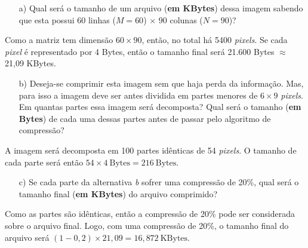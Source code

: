 \documentclass[a4paper,11pt]{article}
\begin{document}
\begin{itemize}
    \item [a)] Qual será o tamanho de um arquivo ({\bf em KBytes}) dessa imagem
sabendo que esta possui 60 linhas ($M = 60$) $\times$ 90 colunas ($N = 90$)?
\end{itemize}

Como a matriz tem dimensão $60 \times 90$, então, no total há 5400 {\it pixels}.
Se cada {\it pixel} é representado por 4 Bytes, então o tamanho final será
21.600 Bytes $\approx$ 21,09 KBytes.

\begin{itemize}
    \item [b)] Deseja-se comprimir esta imagem sem que haja perda da informação.
Mas, para isso a imagem deve ser antes dividida em partes menores de $6 \times
9$ {\it pixels}. Em quantas partes essa imagem será decomposta? Qual será o
tamanho ({\bf em Bytes}) de cada uma dessas partes antes de passar pelo
algoritmo de compressão?
\end{itemize}

A imagem será decomposta em 100 partes idênticas de 54 {\it pixels}. O tamanho
de cada parte será então $54 \times 4\ \text{Bytes} = 216\ \text{Bytes}$.

\begin{itemize}
    \item [c)] Se cada parte da alternativa {\it b} sofrer uma compressão de
20\%, qual será o tamanho final ({\bf em KBytes}) do arquivo comprimido?
\end{itemize}

Como as partes são idênticas, então a compressão de 20\% pode ser considerada
sobre o arquivo final. Logo, com uma compressão de 20\%, o tamanho final do
arquivo será $(1-0,2)\times 21,09 = 16,872\ \text{KBytes}$.

\pagebreak
\end{document}
